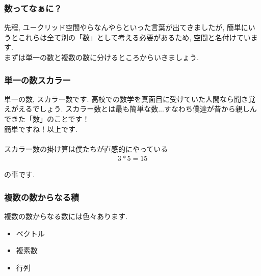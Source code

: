 \documentclass[11pt,a4paper]{jsarticle}
\begin{document}
\subsubsection{数ってなぁに？}
先程, ユークリッド空間やらなんやらといった言葉が出てきましたが, 簡単にいうとこれらは全て別の「数」として考える必要があるため, 空間と名付けています.\\
まずは単一の数と複数の数に分けるところからいきましょう.\\

\subsubsection{単一の数スカラー}
単一の数, スカラー数です. 高校での数学を真面目に受けていた人間なら聞き覚えがえるでしょう. スカラー数とは最も簡単な数...すなわち僕達が昔から親しんできた「数」のことです！\\
簡単ですね！以上です.\\
\\
スカラー数の掛け算は僕たちが直感的にやっている
\begin{eqnarray}
3 * 5 = 15
\end{eqnarray}

の事です.
\\

\subsubsection{複数の数からなる積}
複数の数からなる数には色々あります.\\
\begin{itemize}
 \item ベクトル
 \item 複素数
 \item 行列
\end{itemize}
\end{document}
